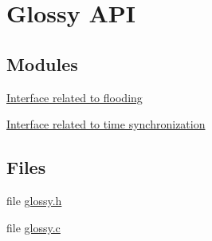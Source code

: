 \hypertarget{group__glossy__interface}{
\section{Glossy API}
\label{group__glossy__interface}
}
\subsection*{Modules}
\begin{DoxyCompactItemize}
\item 
\hyperlink{group__glossy__main}{Interface related to flooding}
\item 
\hyperlink{group__glossy__sync}{Interface related to time synchronization}
\end{DoxyCompactItemize}
\subsection*{Files}
\begin{DoxyCompactItemize}
\item 
file \hyperlink{glossy_8h}{glossy.h}
\item 
file \hyperlink{glossy_8c}{glossy.c}
\end{DoxyCompactItemize}
